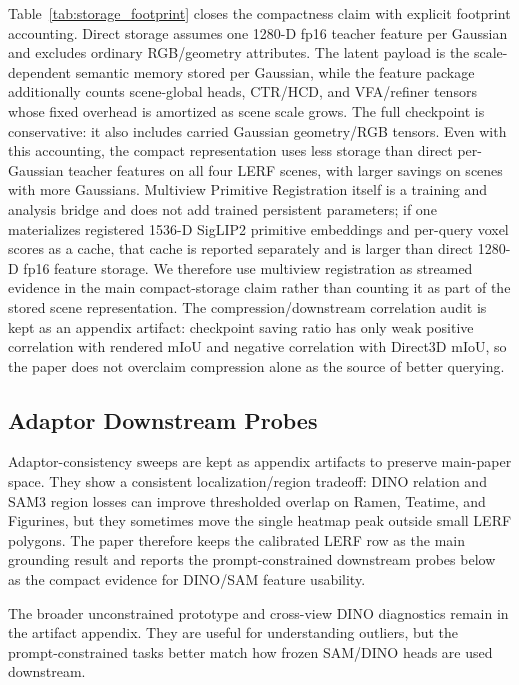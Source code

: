 \documentclass[10pt,twocolumn,letterpaper]{article}
\begin{document}


Table~\ref{tab:storage_footprint} closes the compactness claim with explicit
footprint accounting. Direct storage assumes one 1280-D fp16 teacher feature per
Gaussian and excludes ordinary RGB/geometry attributes. The latent payload is
the scale-dependent semantic memory stored per Gaussian, while the feature
package additionally counts scene-global heads, CTR/HCD, and VFA/refiner tensors
whose fixed overhead is amortized as scene scale grows. The full checkpoint is
conservative: it also includes carried Gaussian geometry/RGB tensors. Even with
this accounting, the compact representation uses less storage than direct
per-Gaussian teacher features on all four LERF scenes, with larger savings on
scenes with more Gaussians. Multiview Primitive Registration itself is a
training and analysis bridge and does not add trained persistent parameters; if
one materializes registered 1536-D SigLIP2 primitive embeddings and per-query
voxel scores as a cache, that cache is reported separately and is larger than
direct 1280-D fp16 feature storage. We therefore use multiview registration as
streamed evidence in the main compact-storage claim rather than counting it as
part of the stored scene representation.
The compression/downstream correlation audit is kept as an appendix artifact:
checkpoint saving ratio has only weak positive correlation with rendered mIoU
and negative correlation with Direct3D mIoU, so the paper does not overclaim
compression alone as the source of better querying.

\subsection{Adaptor Downstream Probes}

Adaptor-consistency sweeps are kept as appendix artifacts to preserve main-paper
space. They show a consistent localization/region tradeoff: DINO relation and
SAM3 region losses can improve thresholded overlap on Ramen, Teatime, and
Figurines, but they sometimes move the single heatmap peak outside small LERF
polygons. The paper therefore keeps the calibrated LERF row as the main
grounding result and reports the prompt-constrained downstream probes below as
the compact evidence for DINO/SAM feature usability.

The broader unconstrained prototype and cross-view DINO diagnostics remain in
the artifact appendix. They are useful for understanding outliers, but the
prompt-constrained tasks better match how frozen SAM/DINO heads are used
downstream.
\end{document}

